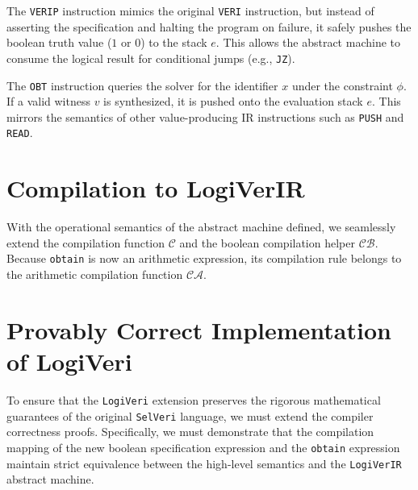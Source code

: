 \documentclass{article}
\begin{document}
The \texttt{VERIP} instruction mimics the original \texttt{VERI} instruction, but instead of asserting the specification and halting the program on failure, it safely pushes the boolean truth value ($1$ or $0$) to the stack $e$. This allows the abstract machine to consume the logical result for conditional jumps (e.g., \texttt{JZ}).

The \texttt{OBT} instruction queries the solver for the identifier $x$ under the constraint $\phi$. If a valid witness $v$ is synthesized, it is pushed onto the evaluation stack $e$. This mirrors the semantics of other value-producing IR instructions such as \texttt{PUSH} and \texttt{READ}.

\section{Compilation to LogiVerIR}

With the operational semantics of the abstract machine defined, we seamlessly extend the compilation function $\mathcal{C}$ and the boolean compilation helper $\mathcal{CB}$. Because \texttt{obtain} is now an arithmetic expression, its compilation rule belongs to the arithmetic compilation function $\mathcal{CA}$.

\begin{table}[h!]
\centering
\renewcommand{\arraystretch}{1.8} 
\caption{Compilation rules for LogiVeri extensions}
\end{table}

\newpage
\section{Provably Correct Implementation of LogiVeri}

To ensure that the \texttt{LogiVeri} extension preserves the rigorous mathematical guarantees of the original \texttt{SelVeri} language, we must extend the compiler correctness proofs. Specifically, we must demonstrate that the compilation mapping of the new boolean specification expression and the \texttt{obtain} expression maintain strict equivalence between the high-level semantics and the \texttt{LogiVerIR} abstract machine.
\end{document}
